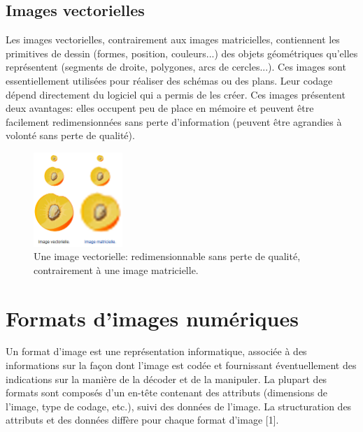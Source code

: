 \subsection{Images vectorielles}
Les images vectorielles, contrairement aux images matricielles, contiennent les primitives de dessin (formes, position, couleurs...) des objets géométriques qu’elles représentent (segments de droite, polygones, arcs de cercles...). Ces images sont essentiellement utilisées pour réaliser des schémas ou des plans. Leur codage dépend directement du logiciel qui a permis de les créer. Ces images présentent deux avantages: elles occupent peu de place en mémoire et peuvent être facilement redimensionnées sans perte d'information (peuvent être agrandies à volonté sans perte de qualité).

\begin{figure}[H]
	\centering
	\includegraphics[width=0.3\textwidth]{Figures/vecteur} 
	\caption{Une image vectorielle: redimensionnable sans perte de qualité, contrairement à une image matricielle.}
\end{figure}



\section{Formats d'images numériques}
Un format d'image est une représentation informatique, associée à des informations sur la façon dont l'image est codée et fournissant éventuellement des indications sur la manière de la décoder et de la manipuler. La plupart des formats sont composés d'un en-tête contenant des attributs (dimensions de l'image, type de codage, etc.), suivi des données de l'image. La structuration des attributs et des données diffère pour chaque format d'image [1].

